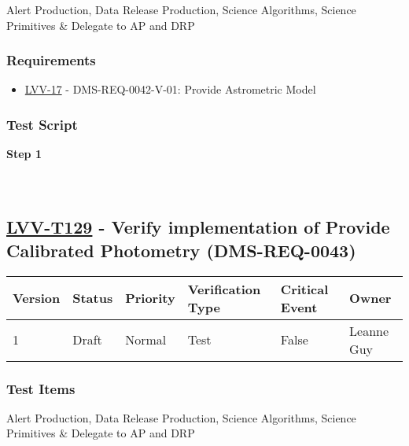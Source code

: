 Alert Production, Data Release Production, Science Algorithms, Science
Primitives \& Delegate to AP and DRP

\hypertarget{requirements-105}{%
\subsubsection{Requirements}\label{requirements-105}}

\begin{itemize}
\tightlist
\item
  \href{https://jira.lsstcorp.org/browse/LVV-17}{LVV-17} -
  DMS-REQ-0042-V-01: Provide Astrometric Model
\end{itemize}

\hypertarget{test-script-105}{%
\subsubsection{Test Script}\label{test-script-105}}

\textbf{Step 1}\\
~\\
~\\

\hypertarget{lvv-t129---verify-implementation-of-provide-calibrated-photometry-dms-req-0043}{%
\subsection{\texorpdfstring{\href{https://jira.lsstcorp.org/secure/Tests.jspa\#/testCase/LVV-T129}{LVV-T129}
- Verify implementation of Provide Calibrated Photometry
(DMS-REQ-0043)}{LVV-T129 - Verify implementation of Provide Calibrated Photometry (DMS-REQ-0043)}}\label{lvv-t129---verify-implementation-of-provide-calibrated-photometry-dms-req-0043}}

\begin{longtable}[]{@{}llllll@{}}
\toprule
Version & Status & Priority & Verification Type & Critical Event &
Owner\tabularnewline
\midrule
\endhead
1 & Draft & Normal & Test & False & Leanne Guy\tabularnewline
\bottomrule
\end{longtable}

\hypertarget{test-items-105}{%
\subsubsection{Test Items}\label{test-items-105}}

Alert Production, Data Release Production, Science Algorithms, Science
Primitives \& Delegate to AP and DRP

